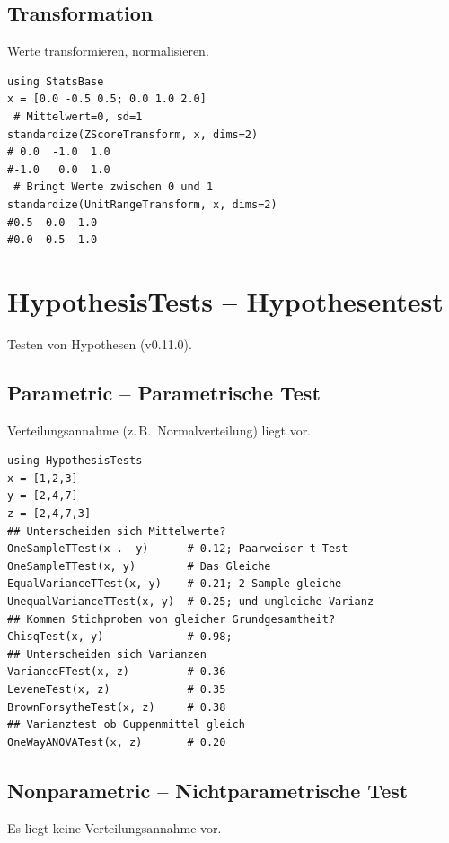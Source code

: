 \documentclass[10pt,twocolumn]{scrartcl}
\begin{document}
\subsection{Transformation}

Werte transformieren, normalisieren.

\begin{lstlisting}
using StatsBase
x = [0.0 -0.5 0.5; 0.0 1.0 2.0]
 # Mittelwert=0, sd=1
standardize(ZScoreTransform, x, dims=2)
# 0.0  -1.0  1.0
#-1.0   0.0  1.0
 # Bringt Werte zwischen 0 und 1
standardize(UnitRangeTransform, x, dims=2)
#0.5  0.0  1.0
#0.0  0.5  1.0
\end{lstlisting}

\section{HypothesisTests -- Hypothesentest}

Testen von Hypothesen (v0.11.0).

\subsection{Parametric -- Parametrische Test}

Verteilungsannahme (z.\,B.\ Normalverteilung) liegt vor.

\begin{lstlisting}
using HypothesisTests
x = [1,2,3]
y = [2,4,7]
z = [2,4,7,3]
## Unterscheiden sich Mittelwerte?
OneSampleTTest(x .- y)      # 0.12; Paarweiser t-Test
OneSampleTTest(x, y)        # Das Gleiche
EqualVarianceTTest(x, y)    # 0.21; 2 Sample gleiche
UnequalVarianceTTest(x, y)  # 0.25; und ungleiche Varianz
## Kommen Stichproben von gleicher Grundgesamtheit?
ChisqTest(x, y)             # 0.98; 
## Unterscheiden sich Varianzen
VarianceFTest(x, z)         # 0.36
LeveneTest(x, z)            # 0.35
BrownForsytheTest(x, z)     # 0.38
## Varianztest ob Guppenmittel gleich
OneWayANOVATest(x, z)       # 0.20
\end{lstlisting}

\subsection{Nonparametric -- Nichtparametrische Test}

Es liegt keine Verteilungsannahme vor.
\end{document}
